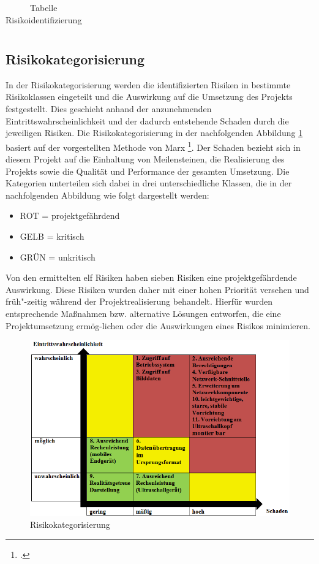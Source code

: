 \begin{center}
\begin{table} [H]
\begin{tabular}{ | p{} | p{} | p{} |}
    \end{tabular}
     \caption{{\small Tabelle Risikoidentifizierung}}
     \label{tab:Risikoidentifizierung}
    \end{table}
\end{center}

\subsection{Risikokategorisierung}
In der Risikokategorisierung werden die identifizierten Risiken in bestimmte Risikoklassen eingeteilt und die Auswirkung auf die Umsetzung des Projekts festgestellt. Dies geschieht anhand der anzunehmenden Eintrittswahrscheinlichkeit und der dadurch entstehende Schaden durch die jeweiligen Risiken. Die Risikokategorisierung in der nachfolgenden Abbildung \ref{fig:risikokategorisierung} basiert auf der vorgestellten Methode von Marx \footcite{Risikomanagement}. Der Schaden bezieht sich in diesem Projekt auf die Einhaltung von Meilensteinen, die Realisierung des Projekts sowie die Qualität und Performance der gesamten Umsetzung. Die Kategorien unterteilen sich dabei in drei unterschiedliche Klassen, die in der nachfolgenden Abbildung wie folgt dargestellt werden:
\begin{itemize}
\item ROT  = projektgefährdend
\item GELB = kritisch
\item GRÜN = unkritisch
\end{itemize}
Von den ermittelten elf Risiken haben sieben Risiken eine projektgefährdende Auswirkung. Diese Risiken wurden daher mit einer hohen Priorität versehen und früh"-zeitig während der Projektrealisierung behandelt. Hierfür wurden entsprechende Maßnahmen bzw. alternative Lösungen entworfen, die eine Projektumsetzung ermög-lichen oder die Auswirkungen eines Risikos minimieren. 
\begin{figure}[h]
	\centering
	\includegraphics[width=1\textwidth]{Bilder/Risiko_und_Anforderungsanalyse/Risikokategorisierung.png}
	\caption{Risikokategorisierung}
	\label{fig:risikokategorisierung}
\end{figure}

